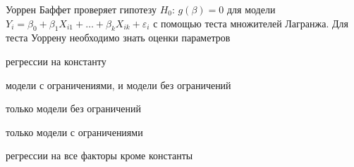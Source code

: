 
\begin{question}
Уоррен Баффет проверяет гипотезу \(H_0\): \(g(\beta)=0\) для модели
\(Y_i = \beta_0 + \beta_1 X_{i1} + \ldots + \beta_k X_{ik} + \varepsilon_i\)
с помощью теста множителей Лагранжа. Для теста Уоррену необходимо знать
оценки параметров
\begin{answerlist}
  \item регрессии на константу
  \item модели с ограничениями, и модели без ограничений
  \item только модели без ограничений
  \item только модели с ограничениями
  \item регрессии на все факторы кроме константы
\end{answerlist}
\end{question}



